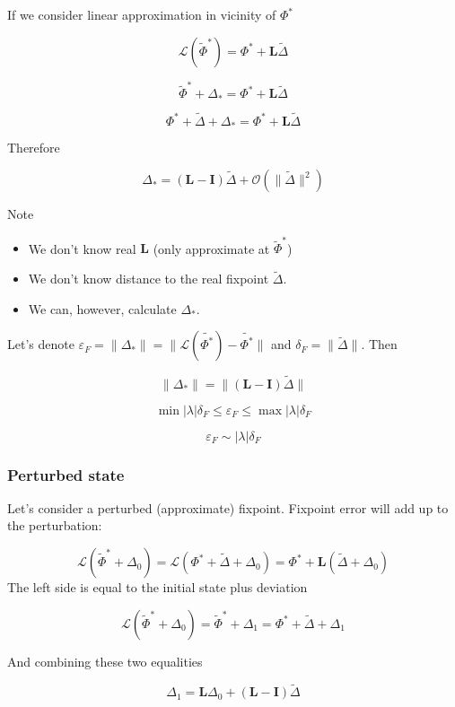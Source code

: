 \documentclass[a4paper,12pt]{article}
\newcommand*{\wt}{\widetilde} %
\newcommand*{\FP}{\Phi^*}%
\newcommand*{\D}{\Delta}%
\begin{document}
\begin{appendices}
If we consider linear approximation in vicinity of $\FP$


$$ \mathcal{L}(\wt \FP) = \FP + \mathbf{L}  \wt{\D}$$

$$ \wt \FP + \D_* = \FP + \mathbf{L}  \wt{\D}$$

$$  \FP + \wt{\D} + \D_* = \FP + \mathbf{L}  \wt{\D}$$

Therefore

\begin{equation}
\D_* = ( \mathbf{L} - \mathbf{I} ) \wt{\D} + \mathcal{O}(\lVert \wt{\D} \rVert^2)
\label{eqn:delta-star}
\end{equation}



Note
\begin{itemize}

\item We don't know real $\mathbf{L}$ (only approximate at $\wt \FP$)
\item We don't know distance to the real fixpoint $\wt{\D}$.
\item We can, however, calculate $\D_*$.

\end{itemize}

Let's denote
 $\varepsilon_{F}
 = \lVert \D_* \rVert
 =\lVert \mathcal{L}(\wt{\FP}) - \wt{\FP}  \rVert$
and $\delta_F = \lVert \wt{\D} \rVert $. Then

$$
\lVert \D_* \rVert = \lVert ( \mathbf{L} - \mathbf{I} ) \wt{\D} \rVert
$$


$$
\min|\lambda| \delta_F
\leq \varepsilon_{F}
\leq \max|\lambda| \delta_F
$$

$$
\varepsilon_{F} \sim |\lambda| \delta_F
$$



\subsubsection{Perturbed state}
Let's consider a perturbed (approximate) fixpoint. Fixpoint error will add up to the perturbation:

$$
\mathcal{L}(\wt{\Phi}^* + \D_0)
= \mathcal{L}(\FP + \wt  \D +  \D_0 )
= \FP +  \mathbf{L}  ( \wt{\D} +  \D_0 )
$$
The left side is equal to the initial state plus deviation

$$
\mathcal{L}(\wt \FP  + \D_0)
= \wt \FP + \D_1
= \FP + \wt{\D}  + \D_1
$$

And combining these two equalities

$$
\D_1
=  \mathbf{L}   \D_0  + (\mathbf{L} - \mathbf{I}) \wt{\D}
$$


\end{appendices}
\end{document}
